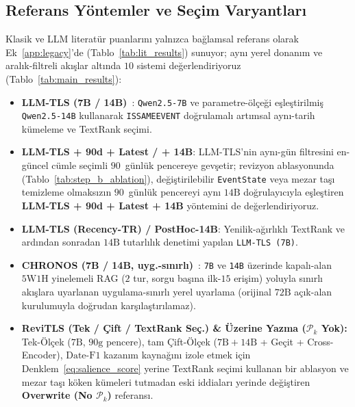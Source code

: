 ﻿\documentclass[journal]{IEEEtran}
\begin{document}
\subsection{Referans Y\"{o}ntemler ve Se\c{c}im Varyantlar{\i}}
\label{subsec:baselines}

Klasik ve LLM literat\"{u}r puanlar{\i}n{\i} yaln{\i}zca ba\u{g}lamsal referans olarak Ek~\ref{app:legacy}'de (Tablo~\ref{tab:lit_results}) sunuyor; ayn{\i} yerel donan{\i}m ve aral{\i}k-filtreli ak{\i}\c{s}lar alt{\i}nda $10$ sistemi de\u{g}erlendiriyoruz (Tablo~\ref{tab:main_results}):
\begin{itemize}
    \item \textbf{LLM-TLS (7B / 14B)}~\cite{hu2024moments}: \texttt{Qwen2.5-7B} ve parametre-\"{o}l\c{c}e\u{g}i e\c{s}le\c{s}tirilmi\c{s} \texttt{Qwen2.5-14B} kullanarak \texttt{ISSAMEEVENT} do\u{g}rulamal{\i} art{\i}msal ayn{\i}-tarih k\"{u}meleme ve TextRank se\c{c}imi.
    \item \textbf{LLM-TLS + 90d + Latest / + 14B}: LLM-TLS'nin ayn{\i}-g\"{u}n filtresini en-g\"{u}ncel c\"{u}mle se\c{c}imli $90$~g\"{u}nl\"{u}k pencereye gev\c{s}etir; revizyon ablasyonunda (Tablo~\ref{tab:step_b_ablation}), de\u{g}i\c{s}tirilebilir \texttt{EventState} veya mezar ta\c{s}{\i} temizleme olmaks{\i}z{\i}n $90$~g\"{u}nl\"{u}k pencereyi ayn{\i} $14\text{B}$ do\u{g}rulay{\i}c{\i}yla e\c{s}le\c{s}tiren \textbf{LLM-TLS + 90d + Latest + 14B} y\"{o}ntemini de de\u{g}erlendiriyoruz.
    \item \textbf{LLM-TLS (Recency-TR) / PostHoc-14B}: Yenilik-a\u{g}{\i}rl{\i}kl{\i} TextRank ve ard{\i}ndan sonradan $14\text{B}$ tutarl{\i}l{\i}k denetimi yap{\i}lan \texttt{LLM-TLS (7B)}.
    \item \textbf{CHRONOS (7B / 14B, uyg.-s{\i}n{\i}rl{\i})}~\cite{wu2025unfolding}: \texttt{7B} ve \texttt{14B} \"{u}zerinde kapal{\i}-alan $5\text{W}1\text{H}$ yinelemeli RAG ($2$ tur, sorgu ba\c{s}{\i}na ilk-$15$ eri\c{s}im) yoluyla s{\i}n{\i}rl{\i} ak{\i}\c{s}lara uyarlanan uygulama-s{\i}n{\i}rl{\i} yerel uyarlama (orijinal $72\text{B}$ a\c{c}{\i}k-alan kurulumuyla do\u{g}rudan kar\c{s}{\i}la\c{s}t{\i}r{\i}lamaz).
    \item \textbf{ReviTLS (Tek / \c{C}ift / TextRank Se\c{c}.) \& \"{U}zerine Yazma ($\mathcal{P}_k$ Yok):} Tek-\"{O}l\c{c}ek ($7\text{B}$, $90\text{g}$ pencere), tam \c{C}ift-\"{O}l\c{c}ek ($7\text{B}+14\text{B}$ + Ge\c{c}it + Cross-Encoder), $\text{Date-F1}$ kazan{\i}m kayna\u{g}{\i}n{\i} izole etmek i\c{c}in Denklem~\eqref{eq:salience_score} yerine TextRank se\c{c}imi kullanan bir ablasyon ve mezar ta\c{s}{\i} k\"{o}ken k\"{u}meleri tutmadan eski iddialar{\i} yerinde de\u{g}i\c{s}tiren \textbf{Overwrite (No $\mathcal{P}_k$)} referans{\i}.
\end{itemize}
\end{document}
